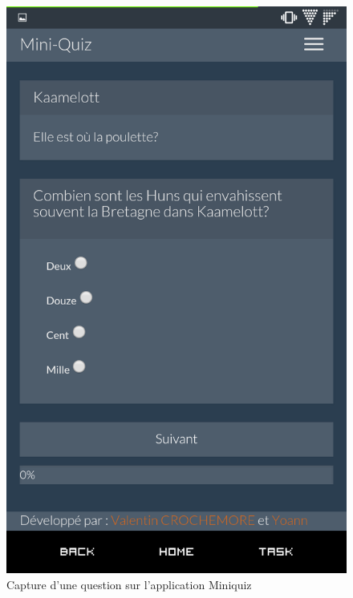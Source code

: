 \documentclass[12pt]{article}
\begin{document}
        \begin{figure}[!ht]
            \caption{\label{fig:miniquiz-question-rwd} Capture d'une question sur l'application Miniquiz}
            \includegraphics[scale=0.2]{res/miniquiz-question-rwd.png}
        \end{figure}
\end{document}
